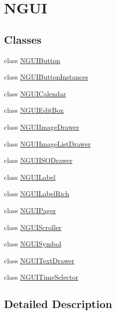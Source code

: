 \hypertarget{group__gr___n_g_u_i}{}\section{N\+G\+UI}
\label{group__gr___n_g_u_i}
\subsection*{Classes}
\begin{DoxyCompactItemize}
\item 
class \hyperlink{class_n_g_u_i_button}{N\+G\+U\+I\+Button}
\item 
class \hyperlink{class_n_g_u_i_button_instances}{N\+G\+U\+I\+Button\+Instances}
\item 
class \hyperlink{class_n_g_u_i_calendar}{N\+G\+U\+I\+Calendar}
\item 
class \hyperlink{class_n_g_u_i_edit_box}{N\+G\+U\+I\+Edit\+Box}
\item 
class \hyperlink{class_n_g_u_i_image_drawer}{N\+G\+U\+I\+Image\+Drawer}
\item 
class \hyperlink{class_n_g_u_i_image_list_drawer}{N\+G\+U\+I\+Image\+List\+Drawer}
\item 
class \hyperlink{class_n_g_u_i_i_s_o_drawer}{N\+G\+U\+I\+I\+S\+O\+Drawer}
\item 
class \hyperlink{class_n_g_u_i_label}{N\+G\+U\+I\+Label}
\item 
class \hyperlink{class_n_g_u_i_label_rich}{N\+G\+U\+I\+Label\+Rich}
\item 
class \hyperlink{class_n_g_u_i_pager}{N\+G\+U\+I\+Pager}
\item 
class \hyperlink{class_n_g_u_i_scroller}{N\+G\+U\+I\+Scroller}
\item 
class \hyperlink{class_n_g_u_i_symbol}{N\+G\+U\+I\+Symbol}
\item 
class \hyperlink{class_n_g_u_i_text_drawer}{N\+G\+U\+I\+Text\+Drawer}
\item 
class \hyperlink{class_n_g_u_i_time_selector}{N\+G\+U\+I\+Time\+Selector}
\end{DoxyCompactItemize}


\subsection{Detailed Description}

